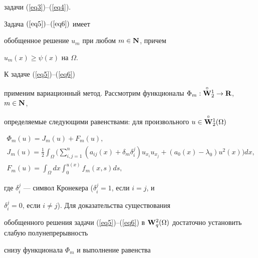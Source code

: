 задачи (\ref{eq3})--(\ref{eq4}).








\begin{lem}


Задача $(\ref{eq5})$--$(\ref{eq6})$ имеет


обобщенное решение $u_m$ при любом $m\in{\bold N}$, причем\linebreak


$u_m(x)\ge\psi(x)$ на $\Omega$.


\end{lem}








\begin{pf}


К задаче (\ref{eq5})--(\ref{eq6})


применим вариационный метод. Рассмотрим функционалы $\Phi_m:


\overset{\circ}{\bold W}{}_2^1 \to {\bold R}$, $m\in{\bold N}$,


определяемые следующими равенствами: для произвольного $u\in


\overset{\circ}{\bold W}{}_2^1(\Omega)$


\begin{gather*}


\Phi_m(u)=J_m(u)+F_m(u),\\


%


J_m(u)=\frac{1}{2}\int_{\Omega}\bigg(\sum_{i,j=1}^{n}(a_{ij}(x)+


\delta_m\delta_i^j)u_{x_i}u_{x_j}+(a_0(x)-\lambda_0)u^2(x)\bigg)dx,\\


%


F_m(u)=\int_{\Omega}dx\int_{0}^{u(x)}f_m(x,s)ds,


\end{gather*}


где $\delta_i^j$ --- символ Кронекера ($\delta_i^j=1$, если $i=j$, и


$\delta_i^j=0$, если $i\neq j$). Для доказательства существования


обобщенного решения задачи (\ref{eq5})--(\ref{eq6}) в ${\bold


W}_q^2(\Omega)$ достаточно установить слабую полунепрерывность


снизу функционала $\Phi_m$ и выполнение равенства



\end{pf}
